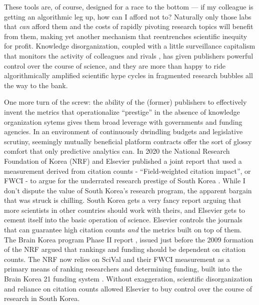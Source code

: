 These tools are, of course, designed for a race to the bottom --- if my
colleague is getting an algorithmic leg up, how can I afford not to?
Naturally only those labs that \emph{can} afford them and the costs of
rapidly pivoting research topics will benefit from them, making yet
another mechanism that reentrenches scientific inequity for profit.
Knowledge disorganization, coupled with a little surveillance capitalism
that monitors the activity of colleagues and rivals \citep{brembsReplacingAcademicJournals2021, hansonUserTrackingAcademic2019} ,
has given publishers powerful control over the course of science, and
they are more than happy to ride algorithmically amplified scientific
hype cycles in fragmented research bubbles all the way to the bank.

One more turn of the screw: the ability of the (former) publishers to
effectively invent the metrics that operationalize ``prestige'' in the
absence of knowledge organization sytems gives them broad leverage with
governments and funding agencies. In an environment of continuously
dwindling budgets and legislative scrutiny, seemingly mutually
beneficial platform contracts offer the sort of glossy comfort that only
predictive analytics can. In 2020 the National Research Foundation of
Korea (NRF) and Elsevier published a joint report that used a
measurement derived from citation counts - ``Field-weighted citation
impact'', or FWCI - to argue for the underrated research prestige of
South Korea \citep{researchfoundationofkoreaSouthKoreaTechnological2020} . While I don't
dispute the value of South Korea's research program, the apparent
bargain that was struck is chilling. South Korea gets a very fancy
report arguing that more scientists in other countries should work with
theirs, and Elsevier gets to cement itself into the basic operation of
science. Elsevier controls the journals that can guarantee high citation
counts \emph{and} the metrics built on top of them. The Brain Korea
program Phase II report  \citep{seongBrainKorea212008} , issued just before the 2009 formation of the
NRF argued that rankings and funding should be dependent on citation
counts. The NRF now relies on SciVal and their FWCI measurement as a
primary means of ranking researchers and determining funding, built into
the Brain Korea 21 funding system \citep{elsevierCaseStudyNational2019, elsevierkoreaSciValHwalyongeulWihan2021} . Without exaggeration, scientific disorganization and reliance on
citation counts allowed Elsevier to buy control over the course of
research in South Korea.


